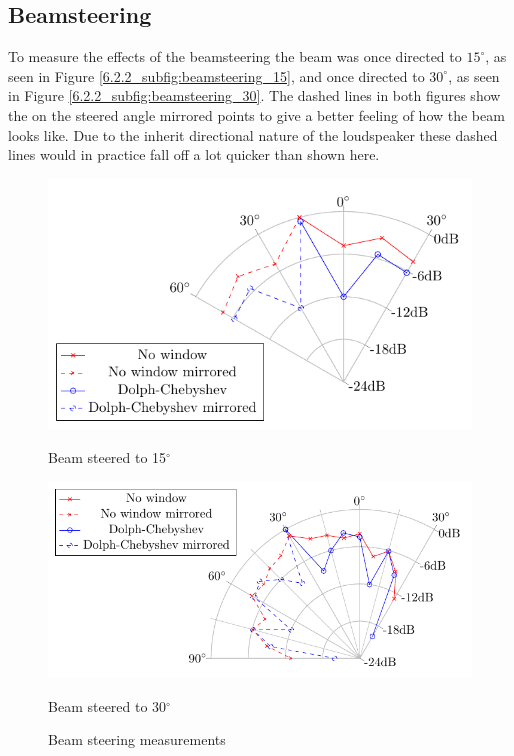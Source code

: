 \subsection{Beamsteering}
To measure the effects of the beamsteering the beam was once directed to $15^\circ$, as seen in Figure \ref{6.2.2_subfig:beamsteering_15}, and once directed to $30^\circ$, as seen in Figure \ref{6.2.2_subfig:beamsteering_30}. The dashed lines in both figures show the on the steered angle mirrored points to give a better feeling of how the beam looks like. Due to the inherit directional nature of the loudspeaker these dashed lines would in practice fall off a lot quicker than shown here. 
\begin{figure}[h!]
    \begin{minipage}{0.49\textwidth}
        \centering
        \includegraphics[width=\linewidth]{images/6_Measurements/Polar_PlotSteering_Measurement_15.pdf}
        \caption{Beam steered to 15$^\circ$}
        \label{6.2.2_subfig:beamsteering_15}
    \end{minipage}
    \begin{minipage}{0.49\textwidth}
        \centering
        \includegraphics[width=\linewidth]{images/6_Measurements/Polar_PlotSteering_Measurement_30.pdf}
        \caption{Beam steered to 30$^\circ$}
         \label{6.2.2_subfig:beamsteering_30}
    \end{minipage}
    \caption{Beam steering measurements}
    \label{6.2.2_subfig:beamsteering}
\end{figure}
